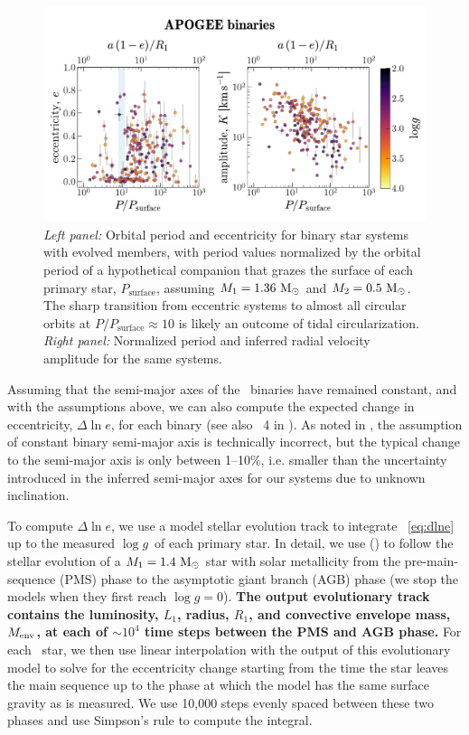 \documentclass[modern, letterpaper]{aastex62}
\newcommand{\apogee}{\project{\acronym{APOGEE}}}
\newcommand{\logg}{\ensuremath{\log g}}
\renewcommand{\changes}[1]{\textbf{#1}}
\begin{document}
\begin{figure}[t]
\begin{center}
\includegraphics[width=\textwidth]{P-e-K}
\end{center}
\caption{%
\textit{Left panel:} Orbital period and eccentricity for binary star systems
with evolved members, with period values normalized by the orbital period
of a hypothetical companion that grazes the surface of each primary star,
$P_{\textrm{surface}}$, assuming $M_1 = 1.36~\mathrm{M}_\odot$ and $M_2 = 0.5~\mathrm{M}_\odot$.
The sharp transition from eccentric systems to almost all circular orbits at
$P/P_\textrm{surface} \approx 10$ is likely an outcome of tidal circularization.
\textit{Right panel:} Normalized period and inferred radial velocity amplitude
for the same systems.
\label{fig:PeK}
}
\end{figure}

Assuming that the semi-major axes of the \apogee\ binaries have remained
constant, and with the assumptions above, we can also compute the expected
change in eccentricity, $\Delta \ln e$, for each binary (see also \figurename~4
in \citealt{Verbunt:1995}).
As noted in \citet{Verbunt:1995}, the assumption of constant binary semi-major
axis is technically incorrect, but the typical change to the semi-major axis is
only between 1--10\%, i.e. smaller than the uncertainty introduced in the
inferred semi-major axes for our systems due to unknown inclination.

To compute $\Delta \ln e$, we use a model stellar evolution track to integrate
\eqname~\ref{eq:dlne} up to the measured \logg\ of each primary star.
In detail, we use  (\citealt{Paxton:2011}) to follow the stellar evolution of a $M_1 = 1.4~\mathrm{M}_\odot$ star with solar metallicity from the pre-main-sequence (PMS) phase to the asymptotic giant branch (AGB) phase (we stop the models when they first reach $\logg = 0$).
\changes{The output evolutionary track contains the luminosity, $L_1$, radius, $R_1$, and convective envelope mass, $M_{\rm env}$, at each of $\sim 10^4$ time steps between the PMS and AGB phase.}
For each \apogee\ star, we then use linear interpolation with the output of this
evolutionary model to solve for the eccentricity change starting from the time
the star leaves the main sequence up to the phase at which the model has the
same surface gravity as is measured.
We use 10,000 steps evenly spaced between these two phases and use Simpson's
rule to compute the integral.
\end{document}
